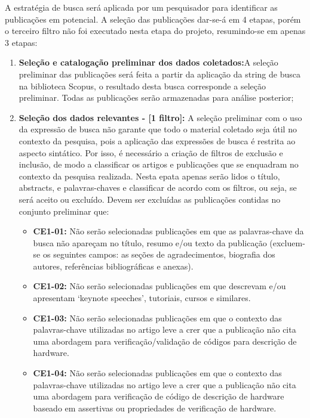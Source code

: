 A estratégia de busca será aplicada por um pesquisador para identificar as publicações em potencial. A seleção das publicações dar-se-á em 4 etapas, porém o terceiro filtro não foi executado nesta etapa do projeto, resumindo-se em apenas 3 etapas:
\begin{enumerate}
\item \textbf{Seleção e catalogação preliminar dos dados coletados:}A seleção preliminar das publicações será feita a partir da aplicação da string de busca na biblioteca Scopus, o resultado desta busca corresponde a seleção preliminar. Todas as publicações serão armazenadas para análise posterior;

\item \textbf{Seleção dos dados relevantes - [1 filtro]:} A seleção preliminar com o uso da expressão de busca não garante que todo o material coletado seja útil no contexto da pesquisa, pois a aplicação das expressões de busca é restrita ao aspecto sintático. Por isso, é necessário a criação de filtros de exclusão e inclusão, de modo a classificar os artigos e publicações que se enquadram no contexto da pesquisa realizada. Nesta epata apenas serão lidos o título, abstracts, e palavras-chaves e classificar de acordo com os filtros, ou seja, se será aceito ou excluído. Devem ser excluídas as publicações contidas no conjunto preliminar que:
	\begin{itemize}
	\item \textbf{CE1-01:} Não serão selecionadas publicações em que as palavras-chave da busca não apareçam no título, resumo e/ou texto da publicação (excluem-se os seguintes campos: as seções de agradecimentos, biografia dos autores, referências bibliográficas e anexas).
	\item \textbf{CE1-02:} Não serão selecionadas publicações em que descrevam e/ou apresentam ‘keynote speeches’, tutoriais, cursos e similares.
	\item \textbf{CE1-03:} Não serão selecionadas publicações em que o contexto das palavras-chave utilizadas no artigo leve a crer que a publicação não cita uma abordagem para verificação/validação de códigos para descrição de hardware.   
	\item \textbf{CE1-04:} Não serão selecionadas publicações em que o contexto das palavras-chave utilizadas no artigo leve a crer que a publicação não cita uma abordagem para verificação de código de descrição de hardware baseado em assertivas ou propriedades de verificação de hardware.
\end{itemize}


\end{enumerate}
